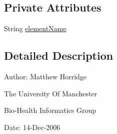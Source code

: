 \subsection*{Private Attributes}
\begin{DoxyCompactItemize}
\item 
String \hyperlink{classorg_1_1coode_1_1owlapi_1_1owlxmlparser_1_1_abstract_element_handler_factory_ab8c7a850a90b934dcfc64e5a3f1affdc}{element\-Name}
\end{DoxyCompactItemize}


\subsection{Detailed Description}
Author\-: Matthew Horridge\par
 The University Of Manchester\par
 Bio-\/\-Health Informatics Group\par
 Date\-: 14-\/\-Dec-\/2006\par
\par
 

